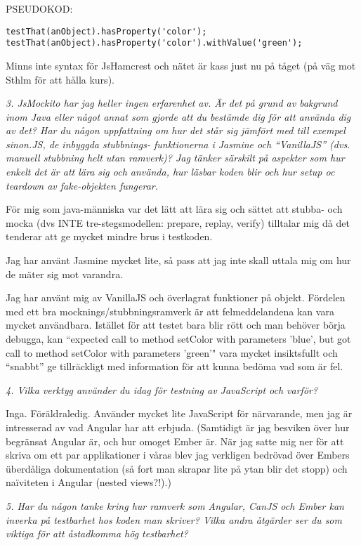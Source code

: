 \documentclass[11pt]{article}
\begin{document}
PSEUDOKOD:
\begin{verbatim}
testThat(anObject).hasProperty('color');
testThat(anObject).hasProperty('color').withValue('green');
\end{verbatim}

Minns inte syntax för JsHamcrest och nätet är kass just nu på tåget (på
väg mot Sthlm för att hålla kurs).

\emph{3. JsMockito har jag heller ingen erfarenhet av. Är det på grund av
bakgrund inom Java eller något annat som gjorde att du bestämde dig
för att använda dig av det? Har du någon uppfattning om hur det står
sig jämfört med till exempel sinon.JS, de inbyggda stubbnings-
funktionerna i Jasmine och ``VanillaJS'' (dvs. manuell stubbning helt
utan ramverk)? Jag tänker särskilt på aspekter som hur enkelt det är
att lära sig och använda, hur läsbar koden blir och hur setup oc
 teardown av fake-objekten fungerar.}

För mig som java-människa var det lätt att lära sig och sättet att
stubba- och mocka (dvs INTE tre-stegsmodellen: prepare, replay, verify)
tilltalar mig då det tenderar att ge mycket mindre brus i testkoden.

Jag har använt Jasmine mycket lite, så pass att jag inte skall uttala
mig om hur de mäter sig mot varandra.

Jag har använt mig av VanillaJS och överlagrat funktioner på objekt.
Fördelen med ett bra mocknings/stubbningsramverk är att felmeddelandena
kan vara mycket användbara. Istället för att testet bara blir rött och
man behöver börja debugga, kan ``expected call to method setColor with
parameters 'blue', but got call to method setColor with parameters
'green'" vara mycket insiktsfullt och ``snabbt'' ge tillräckligt med
information för att kunna bedöma vad som är fel.

\emph{4. Vilka verktyg använder du idag för testning av JavaScript och varför?}

Inga. Föräldraledig. Använder mycket lite JavaScript för närvarande, men
jag är intresserad av vad Angular har att erbjuda. (Samtidigt är jag
besviken över hur begränsat Angular är, och hur omoget Ember är. När jag
satte mig ner för att skriva om ett par applikationer i våras blev jag
verkligen bedrövad över Embers überdåliga dokumentation (så fort man
skrapar lite på ytan blir det stopp) och naïviteten i Angular (nested
views?!).)

\emph{5. Har du någon tanke kring hur ramverk som Angular, CanJS och Ember kan
inverka på testbarhet hos koden man skriver? Vilka andra åtgärder ser
du som viktiga för att åstadkomma hög testbarhet?}
\end{document}
